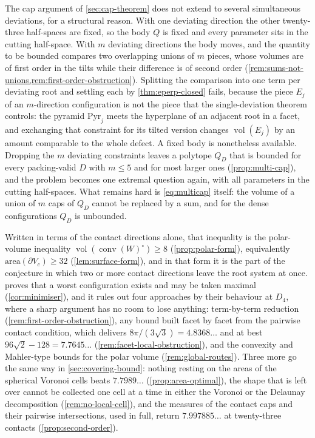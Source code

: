 \documentclass[11pt,reqno]{amsart}
\renewcommand{\_}{\origunderscore\allowbreak}
\numberwithin{equation}{section}
\theoremstyle{plain}
\theoremstyle{definition}
\theoremstyle{remark}
\DeclareMathOperator{\vol}{vol}
\DeclareMathOperator{\conv}{conv}
\begin{document}
The cap argument of \cref{sec:cap-theorem} does not extend to several
simultaneous deviations, for a structural reason. With one deviating
direction the other twenty-three half-spaces are fixed, so the body $Q$ is
fixed and every parameter sits in the cutting half-space. With $m$
deviating directions the body moves, and the quantity to be bounded
compares two overlapping unions of $m$ pieces, whose volumes are of first
order in the tilts while their difference is of second order
(\cref{rem:sums-not-unions,rem:first-order-obstruction}). Splitting the
comparison into one term per deviating root and settling each by
\cref{thm:eperp-closed} fails, because the piece $E_j$ of an
$m$-direction configuration is not the piece that the single-deviation
theorem controls: the pyramid $\mathrm{Pyr}_j$ meets the hyperplane of an
adjacent root in a facet, and exchanging that constraint for its tilted
version changes $\vol(E_j)$ by an amount comparable to the whole defect.
A fixed body is nonetheless available. Dropping the $m$ deviating
constraints leaves a polytope $Q_D$ that is bounded for every
packing-valid $D$ with $m\le5$ and for most larger ones
(\cref{prop:multi-cap}), and the problem becomes one extremal question
again, with all parameters in the cutting half-spaces. What remains hard is
\eqref{eq:multicap} itself: the volume of a union of $m$ caps of $Q_D$
cannot be replaced by a sum, and for the dense configurations $Q_D$ is
unbounded.

Written in terms of the contact directions alone, that inequality is the
polar-volume inequality $\vol(\conv(W)^{\circ})\ge8$
(\cref{prop:polar-form}), equivalently $\mathrm{area}(\partial V_c)\ge32$
(\cref{lem:surface-form}), and in that form it is the part of the
conjecture in which two or more contact directions leave the root system at
once.  proves that a worst configuration exists and
may be taken maximal (\cref{cor:minimiser}), and it rules out four
approaches by their behaviour at $D_4$, where a sharp argument has no room
to lose anything: term-by-term reduction
(\cref{rem:first-order-obstruction}), any bound built facet by facet from
the pairwise contact condition, which delivers $8\pi/(3\sqrt3)=4.8368\ldots$
and at best $96\sqrt2-128=7.7645\ldots$
(\cref{rem:facet-local-obstruction}), and the convexity and Mahler-type
bounds for the polar volume (\cref{rem:global-routes}). Three more go the
same way in \cref{sec:covering-bound}: nothing resting on the areas of the
spherical Voronoi cells beats $7.7989\ldots$ (\cref{prop:area-optimal}), the
shape that is left over cannot be collected one cell at a time in either
the Voronoi or the Delaunay decomposition (\cref{rem:no-local-cell}), and
the measures of the contact caps and their pairwise intersections, used in
full, return $7.997885\ldots$ at twenty-three contacts
(\cref{prop:second-order}).
\end{document}
